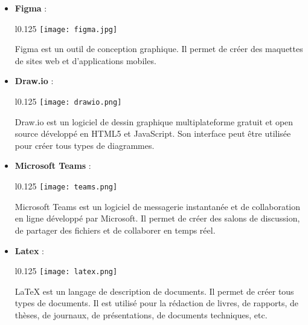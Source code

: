 \begin{itemize}
    \vspace{0.5cm}
    \item \textbf{Figma} :\\
    \begin{minipage}{\linewidth}
      \begin{wrapfigure}{l}{0.125\textwidth}
        \vspace{-0.8cm}
        \texttt{[image: figma.jpg]} 
      \end{wrapfigure}
      Figma est un outil de conception graphique. Il permet de créer des maquettes de sites web et d'applications mobiles. \cite{figma}
    \end{minipage}

    \vspace{0.5cm}
    \item \textbf{Draw.io} :\\
    \begin{minipage}{\linewidth}
      \begin{wrapfigure}{l}{0.125\textwidth}
        \vspace{-0.5cm}
        \texttt{[image: drawio.png]} 
      \end{wrapfigure}
      Draw.io est un logiciel de dessin graphique multiplateforme gratuit et open source développé en HTML5 et JavaScript. Son interface peut être utilisée pour créer tous types de diagrammes. \cite{drawio}
    \end{minipage}

    \vspace{0.5cm}
    \item \textbf{Microsoft Teams} :\\
    \begin{minipage}{\linewidth}
      \begin{wrapfigure}{l}{0.125\textwidth}
        \vspace{-0.5cm}
        \texttt{[image: teams.png]} 
      \end{wrapfigure}
      Microsoft Teams est un logiciel de messagerie instantanée et de collaboration en ligne développé par Microsoft. Il permet de créer des salons de discussion, de partager des fichiers et de collaborer en temps réel. \cite{teams}
    \end{minipage}

    \vspace{0.5cm}
    \item \textbf{Latex} :\\
    \begin{minipage}{\linewidth}
      \begin{wrapfigure}{l}{0.125\textwidth}
        \vspace{-0.5cm}
        \texttt{[image: latex.png]} 
      \end{wrapfigure}
      LaTeX est un langage de description de documents. Il permet de créer tous types de documents. Il est utilisé pour la rédaction de livres, de rapports, de thèses, de journaux, de présentations, de documents techniques, etc. \cite{latex}
    \end{minipage}


\end{itemize}
